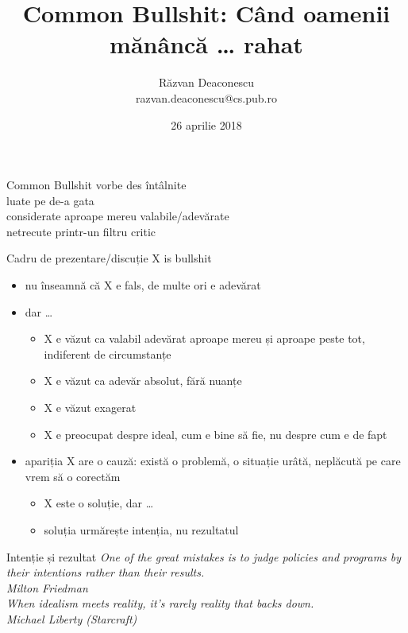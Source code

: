 \documentclass{beamer}
\title[Common Bullshit]{Common Bullshit: Când oamenii mănâncă \ldots{} rahat}
\institute{}
\author[Răzvan Deaconescu]{Răzvan Deaconescu \\
razvan.deaconescu@cs.pub.ro}
\date{26 aprilie 2018}
\begin{document}
\frame{\titlepage}

\begin{frame}{Common Bullshit}
  \centering
  \Large
  \pause vorbe des întâlnite \\
  \pause luate pe de-a gata \\
  \pause considerate aproape mereu valabile/adevărate \\
  \pause netrecute printr-un filtru critic \\
\end{frame}

\begin{frame}{Cadru de prezentare/discuție}
  \pause X is bullshit
  \begin{itemize}
    \pause \item nu înseamnă că X e fals, de multe ori e adevărat
    \pause \item dar \ldots
      \begin{itemize}
        \pause \item X e văzut ca valabil adevărat aproape mereu și aproape peste tot, indiferent de circumstanțe
        \pause \item X e văzut ca adevăr absolut, fără nuanțe
        \pause \item X e văzut exagerat
        \pause \item X e preocupat despre ideal, cum e bine să fie, nu despre cum e de fapt
      \end{itemize}
    \pause \item apariția X are o cauză: există o problemă, o situație urâtă, neplăcută pe care vrem să o corectăm
      \begin{itemize}
        \pause \item X este o soluție, dar \ldots
        \pause \item soluția urmărește intenția, nu rezultatul
      \end{itemize}
  \end{itemize}
\end{frame}

\begin{frame}{Intenție și rezultat}
  \centering
  \pause \textit{One of the great mistakes is to judge policies and programs by their intentions rather than their results.}\\
  \vspace{3mm}
  \hfill \textit{Milton Friedman} \\
  \vspace{2cm}
  \centering
  \pause \textit{When idealism meets reality, it's rarely reality that backs down.} \\
  \vspace{3mm}
  \hfill \textit{Michael Liberty (Starcraft)}
\end{frame}
\end{document}

